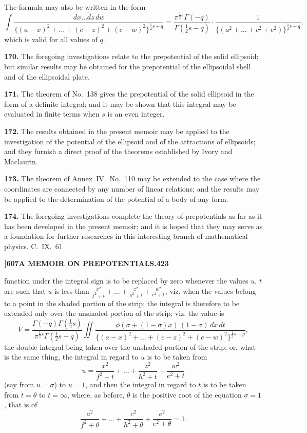 \documentclass[11pt,a4paper]{book}
\begin{document}
{The formula may also be written in the form
\[
\int \frac{dx\ldots dz\, dw}{\{(a-x)^2 + \ldots + (c-z)^2 + (e-w)^2\}^{\frac{1}{2}s+q}} = \frac{\pi^{\frac{1}{2}s}\Gamma(-q)}{\Gamma(\frac{1}{2}s-q)} \cdot \frac{1}{\{(a^2 + \ldots + c^2 + e^2)\}^{\frac{1}{2}s+q}},
\]
which is valid for all values of $q$.

\medskip
\noindent\textbf{170.}
The foregoing investigations relate to the prepotential of the solid ellipsoid; but similar results may be obtained for the prepotential of the ellipsoidal shell and of the ellipsoidal plate.

\medskip
\noindent\textbf{171.}
The theorem of No.~138 gives the prepotential of the solid ellipsoid in the form of a definite integral; and it may be shown that this integral may be evaluated in finite terms when $s$ is an even integer.

\medskip
\noindent\textbf{172.}
The results obtained in the present memoir may be applied to the investigation of the potential of the ellipsoid and of the attractions of ellipsoids; and they furnish a direct proof of the theorems established by Ivory and Maclaurin.

\medskip
\noindent\textbf{173.}
The theorem of Annex~IV.\ No.~110 may be extended to the case where the coordinates are connected by any number of linear relations; and the results may be applied to the determination of the potential of a body of any form.

\medskip
\noindent\textbf{174.}
The foregoing investigations complete the theory of prepotentials as far as it has been developed in the present memoir; and it is hoped that they may serve as a foundation for further researches in this interesting branch of mathematical physics.
\hfill C.~IX.\ 61

\newpage
\noindent\textbf{[607}\hspace{\fill}\textbf{A MEMOIR ON PREPOTENTIALS.}\hspace{\fill}\textbf{423}

function under the integral sign is to be replaced by zero whenever the values $u$, $t$ are such that $u$ is less than $\frac{x^2}{f^2+t} + \ldots + \frac{z^2}{h^2+t} + \frac{w^2}{e^2+t}$, viz. when the values belong to a point in the shaded portion of the strip; the integral is therefore to be extended only over the unshaded portion of the strip; viz. the value is
\[
V = \frac{\Gamma(-q)\Gamma(\frac{1}{2}s)}{\pi^{\frac{1}{2}s}\Gamma(\frac{1}{2}s-q)} \iint \frac{\phi(\sigma + (1-\sigma)x)\, (1-\sigma)\, dx\, dt}{\{(a-x)^2 + \ldots + (c-z)^2 + (e-w)^2\}^{\frac{1}{2}s-p}},
\]
the double integral being taken over the unshaded portion of the strip; or, what is the same thing, the integral in regard to $u$ is to be taken from
\[
u = \frac{x^2}{f^2+t} + \ldots + \frac{z^2}{h^2+t} + \frac{w^2}{e^2+t}
\]
(say from $u = \sigma$) to $u = 1$, and then the integral in regard to $t$ is to be taken from $t = \theta$ to $t = \infty$, where, as before, $\theta$ is the positive root of the equation $\sigma = 1$, that is of
\[
\frac{a^2}{f^2+\theta} + \ldots + \frac{c^2}{h^2+\theta} + \frac{e^2}{e^2+\theta} = 1.
\]

}
\end{document}
